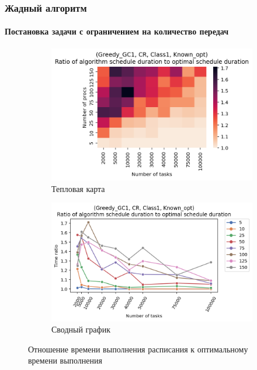 \subsubsection{Жадный алгоритм}

\paragraph{Постановка задачи с ограничением на количество передач}

\begin{figure}[!htbp]
    \centering
    \begin{subfigure}{0.49\textwidth}
        \includegraphics[width=\textwidth]{imgs/ideal_1/CR/th.png}
        \caption{Тепловая карта}
        \label{fig:CR-GC1-times-heatmap}
    \end{subfigure}
    \hfill
    \begin{subfigure}{0.49\textwidth}
        \includegraphics[width=\textwidth]{imgs/ideal_1/CR/gr_amalgamated.png}
        \caption{Сводный график}   
        \label{fig:CR-GC1-times-compiled} 
    \end{subfigure}
    \caption{Отношение времени выполнения расписания к оптимальному времени выполнения}
\end{figure}

